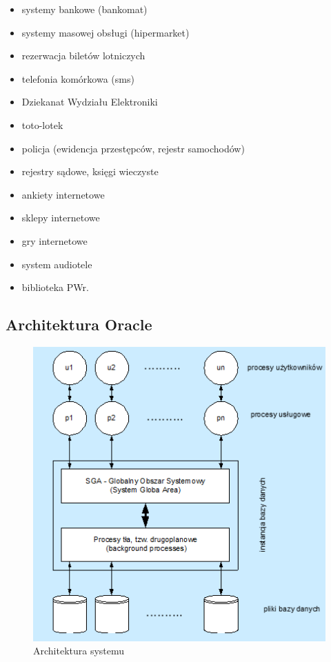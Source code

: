 \documentclass[]{report}
\begin{document}
\begin{itemize}
\item systemy bankowe (bankomat)
\item systemy masowej obsługi (hipermarket)
\item rezerwacja biletów lotniczych
\item telefonia komórkowa (sms)
\item Dziekanat Wydziału Elektroniki
\item toto-lotek
\item policja (ewidencja przestępców, rejestr samochodów)
\item rejestry sądowe, księgi wieczyste
\item ankiety internetowe
\item sklepy internetowe
\item gry internetowe
\item system audiotele
\item biblioteka PWr.

\end{itemize}


\subsection{Architektura Oracle}

\begin{figure}[htbp]
\centering
\includegraphics[scale=0.7]{archoracle.png}
\caption{Architektura systemu}
\end{figure}
\end{document}
